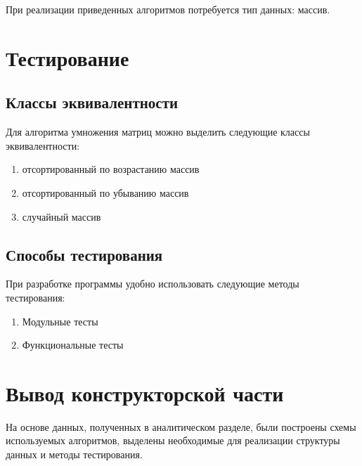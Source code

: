 При реализации приведенных алгоритмов потребуется тип данных: массив.

\section{Тестирование}\label{Testing}

\subsection{Классы эквивалентности}\label{TestingClasses}

Для алгоритма умножения матриц можно выделить следующие классы эквивалентности:

\begin{enumerate}
    \item отсортированный по возрастанию массив
    \item отсортированный по убыванию массив 
    \item случайный массив
\end{enumerate}

\subsection{Способы тестирования}\label{TestingMethods}

При разработке программы удобно использовать следующие методы тестирования:

\begin{enumerate}
    \item Модульные тесты 
    \item Функциональные тесты 
\end{enumerate} 

\section{Вывод конструкторской части}\label{KonstructResult}
На основе данных, полученных в аналитическом разделе, были построены схемы используемых алгоритмов,
выделены необходимые для реализации структуры данных и методы тестирования.

